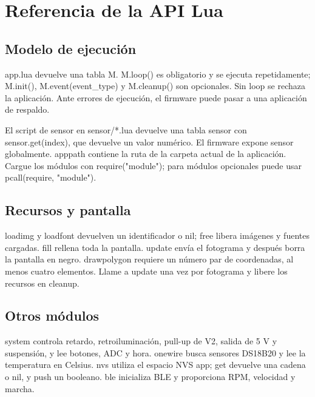 \chapter{Referencia de la API Lua}
\section{Modelo de ejecución}
app.lua devuelve una tabla M. M.loop() es obligatorio y se ejecuta repetidamente; M.init(), M.event(event\_type) y M.cleanup() son opcionales. Sin loop se rechaza la aplicación. Ante errores de ejecución, el firmware puede pasar a una aplicación de respaldo.

El script de sensor en sensor/*.lua devuelve una tabla sensor con sensor.get(index), que devuelve un valor numérico. El firmware expone sensor globalmente. apppath contiene la ruta de la carpeta actual de la aplicación. Cargue los módulos con require("module"); para módulos opcionales puede usar pcall(require, "module").
\section{Recursos y pantalla}
loadimg y loadfont devuelven un identificador o nil; free libera imágenes y fuentes cargadas. fill rellena toda la pantalla. update envía el fotograma y después borra la pantalla en negro. drawpolygon requiere un número par de coordenadas, al menos cuatro elementos. Llame a update una vez por fotograma y libere los recursos en cleanup.
\section{Otros módulos}
system controla retardo, retroiluminación, pull-up de V2, salida de 5 V y suspensión, y lee botones, ADC y hora. onewire busca sensores DS18B20 y lee la temperatura en Celsius. nvs utiliza el espacio NVS app; get devuelve una cadena o nil, y push un booleano. ble inicializa BLE y proporciona RPM, velocidad y marcha.
